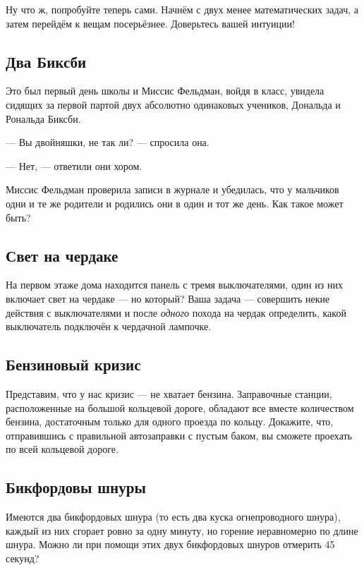 \medskip

Ну что ж, попробуйте теперь сами.
Начнём с двух менее математических задач, а затем перейдём к вещам посерьёзнее.
Доверьтесь вашей интуиции!

\subsection*{Два Биксби} %

Это был первый день школы и Миссис Фельдман, войдя в класс, увидела сидящих за первой партой двух абсолютно одинаковых учеников, Дональда и Рональда Биксби.

--- Вы двойняшки, не так ли? --- спросила она.

--- Нет, --- ответили они хором.

Миссис Фельдман проверила записи в журнале и убедилась, что у мальчиков одни и те же родители и родились они в один и тот же день.
Как такое может быть?

\subsection*{Свет на чердаке} %

На первом этаже дома находится панель с тремя выключателями, один из них включает свет на чердаке --- но который? 
Ваша задача --- совершить некие действия с выключателями и после \emph{одного} похода на чердак определить, какой выключатель подключён к чердачной лампочке.

\subsection*{Бензиновый кризис} %

Представим, что у нас кризис --- не хватает бензина.
Заправочные станции, расположенные на большой кольцевой дороге, обладают все вместе количеством бензина, достаточным только для одного проезда по кольцу.
Докажите, что, отправившись с правильной автозаправки с пустым баком, вы сможете проехать по всей кольцевой дороге.

\subsection*{Бикфордовы шнуры} %

Имеются два бикфордовых шнура (то есть два куска огнепроводного шнура), каждый из них сгорает ровно за одну минуту, но горение неравномерно по длине шнура.
Можно ли при помощи этих двух бикфордовых шнуров отмерить 45 секунд?

